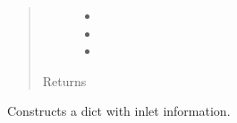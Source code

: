 \documentclass[letterpaper,10pt,english]{sphinxmanual}
\begin{document}
\begin{fulllineitems}
\begin{fulllineitems}
\begin{quote}
\begin{description}
\begin{itemize}
\item {} 
 \textendash{} 

\item {} 
 \textendash{} 

\item {} 
 \textendash{} 

\end{itemize}

\item[{Returns}] \leavevmode


\end{description}\end{quote}

\end{fulllineitems}


\begin{fulllineitems}
\label{\detokenize{cmf:livestock.components.comp_cmf.CMFInlet.set_inlet}}
Constructs a dict with inlet information.

\end{fulllineitems}


\end{fulllineitems}

\end{document}
